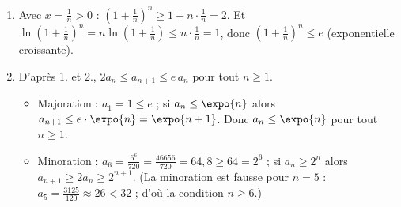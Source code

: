 \begin{description}
\begin{enumerate}
			$\frac{a_{n+1}}{a_n} = \frac{(n+1)^{n+1}}{(n+1)!} \cdot \frac{n!}{n^n} = \frac{(n+1)^{n+1}}{(n+1)\, n^n} = \left(\frac{n+1}{n}\right)^n = \left(1 + \frac{1}{n}\right)^n > 1$.
			Les termes étant positifs, \par\noindent{}
		\item {}
			Avec $x = \frac{1}{n} > 0$ : $\left(1 + \frac{1}{n}\right)^n \geq 1 + n \cdot \frac{1}{n} = 2$.
			Et $\ln\left(1 + \frac{1}{n}\right)^n = n\ln\left(1 + \frac{1}{n}\right) \leq n \cdot \frac{1}{n} = 1$, donc $\left(1 + \frac{1}{n}\right)^n \leq e$ (exponentielle croissante).
			\par\noindent{}
		\item {}
			D'après 1. et 2., $2a_n \leq a_{n+1} \leq e\, a_n$ pour tout $n \geq 1$.
			\begin{itemize}
				\item Majoration : $a_1 = 1 \leq e$ ; si $a_n \leq \expo{n}$ alors $a_{n+1} \leq e \cdot \expo{n} = \expo{n+1}$. Donc $a_n \leq \expo{n}$ pour tout $n \geq 1$.
				\item Minoration : $a_6 = \frac{6^6}{720} = \frac{46656}{720} = 64{,}8 \geq 64 = 2^6$ ; si $a_n \geq 2^n$ alors $a_{n+1} \geq 2a_n \geq 2^{n+1}$.
					(La minoration est fausse pour $n = 5$ : $a_5 = \frac{3125}{120} \approx 26 < 32$ ; d'où la condition $n \geq 6$.)
			\end{itemize}
	\end{enumerate}
\end{description}
